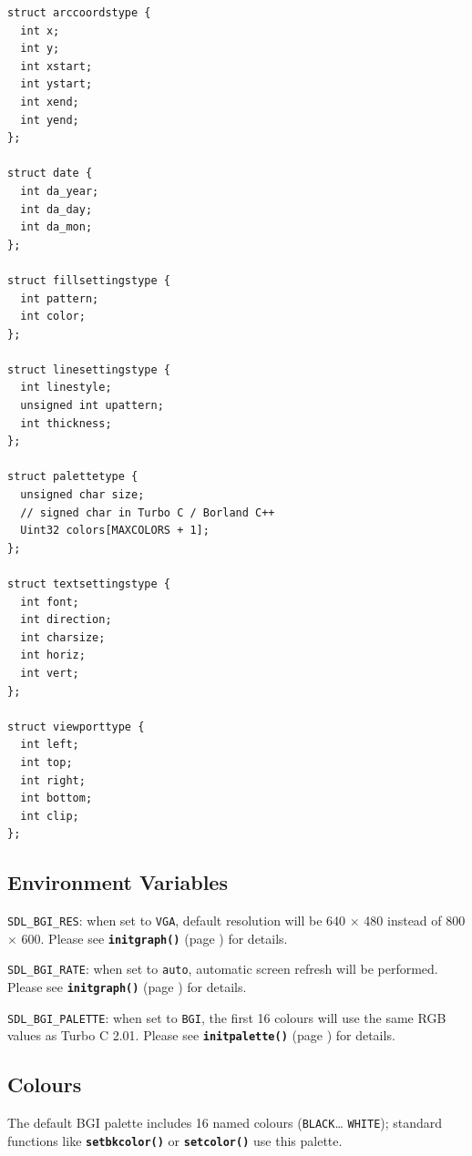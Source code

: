 \documentclass[a4paper,12pt]{article}
\newcommand{\func}[1]{\textbf{\texttt{#1}}}  %
\newcommand{\T}[1]{\texttt{#1}}     %
\begin{document}
\begin{small}
\begin{spacing}{0.85}
\begin{verbatim}
struct arccoordstype {
  int x;
  int y;
  int xstart;
  int ystart;
  int xend;
  int yend;
};

struct date {
  int da_year;
  int da_day;
  int da_mon;
};

struct fillsettingstype {
  int pattern;
  int color;
};

struct linesettingstype {
  int linestyle;
  unsigned int upattern;
  int thickness;
};

struct palettetype {
  unsigned char size;
  // signed char in Turbo C / Borland C++
  Uint32 colors[MAXCOLORS + 1];
};

struct textsettingstype {
  int font;
  int direction;
  int charsize;
  int horiz;
  int vert;
};

struct viewporttype {
  int left;
  int top;
  int right;
  int bottom;
  int clip;
};
\end{verbatim}
\end{spacing}
\end{small}


\subsection{Environment Variables}

\T{SDL\_BGI\_RES}: when set to \T{VGA}, default resolution will be 640
$\times$ 480 instead of 800 $\times$ 600. Please see
\func{initgraph()} (page \pageref{sec:initgraph}) for details.

\T{SDL\_BGI\_RATE}: when set to \T{auto}, automatic screen refresh
will be performed. Please see \func{initgraph()} (page
\pageref{sec:initgraph}) for details.

\T{SDL\_BGI\_PALETTE}: when set to \T{BGI}, the first 16 colours will
use the same RGB values as Turbo C 2.01. Please see
\func{initpalette()} (page \pageref{sec:initpalette}) for details.


\subsection{Colours}

The default BGI palette includes 16 named colours (\T{BLACK}{\ldots}
\T{WHITE}); standard functions like \func{setbkco\-lor()} or
\func{setcolor()} use this palette.
\end{document}
